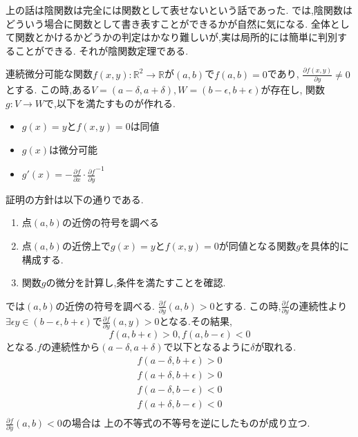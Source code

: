 上の話は陰関数は完全には関数として表せないという話であった.
では,陰関数はどういう場合に関数として書き表すことができるかが自然に気になる.
全体として関数とかけるかどうかの判定はかなり難しいが,実は局所的には簡単に判別することができる.
それが陰関数定理である.

\begin{thm}[陰関数定理]
連続微分可能な関数$f(x ,y): \mathbb{R}^2 \to \mathbb{R}$が$(a, b)$で$f(a , b) = 0$であり,
$\frac{\partial f(x, y)}{\partial y} \neq 0$とする.
この時,ある$V = (a - \delta, a + \delta),W = (b - \epsilon , b + \epsilon)$が存在し,
関数$g:V \to W$で,以下を満たすものが作れる.
\begin{itemize}
  \item $g(x) = y$と$f(x, y) = 0$は同値
  \item $g(x)$は微分可能
  \item $g'(x) = - \frac{\partial f}{\partial x} \cdot \frac{\partial f}{\partial y}^{-1}$
\end{itemize}
\end{thm}

証明の方針は以下の通りである.
\begin{enumerate}
    \item 点$(a,b)$の近傍の符号を調べる
    \item 点$(a,b)$の近傍上で$g(x) =y$と$f(x,y) =0$が同値となる関数$g$を具体的に構成する.
    \item 関数$g$の微分を計算し,条件を満たすことを確認.
\end{enumerate}

では$(a,b)$の近傍の符号を調べる.
$\frac{\partial f}{\partial y}(a, b) > 0$とする.
この時,$\frac{\partial f}{\partial y}$の連続性より$\exists  \epsilon y \in (b - \epsilon, b + \epsilon)$で$\frac{\partial f}{\partial y}(a, y) > 0$となる.その結果,
\begin{equation*}
  f(a, b + \epsilon) > 0, f(a, b - \epsilon) < 0
\end{equation*}
となる.$f$の連続性から$(a - \delta, a + \delta)$で以下となるように$\delta$が取れる.
\begin{align*}
  f(a - \delta, b + \epsilon) > 0 \\
  f(a + \delta, b + \epsilon) > 0 \\
  f(a - \delta, b - \epsilon) < 0 \\
  f(a + \delta, b - \epsilon) < 0 \\
\end{align*}
$\frac{\partial f}{\partial y}(a, b) < 0$の場合は
上の不等式の不等号を逆にしたものが成り立つ.

